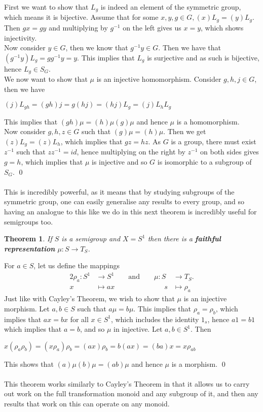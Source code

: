 \documentclass[12pt]{article}
\newtheorem{theorem}{Theorem}[subsection]
\begin{document}
	First we want to show that $L_g$ is indeed an element of the symmetric group, which means it is bijective. Assume that for some $x,y,g \in G, (x)L_g=(y)L_g$. Then $gx = gy$ and multiplying by $g^{-1}$ on the left gives us $x=y$, which shows injectivity.\\
	Now consider $y \in G$, then we know that $g^{-1}y \in G$. Then we have that $(g^{-1}y)L_g = gg^{-1}y = y$. This implies that $L_g$ is surjective and as such is bijective, hence $L_g \in S_G$. \\
	We now want to show that $\mu$ is an injective homomorphism. Consider $g,h,j \in G$, then we have
	\begin{center}
		$(j)L_{gh}=(gh)j=g(hj)=(hj)L_g=(j)L_hL_g$
	\end{center}
	This implies that $(gh)\mu = (h)\mu(g)\mu$ and hence $\mu$ is a homomorphism.\\
	Now consider $g,h,z \in G$ such that $(g)\mu = (h)\mu$. Then we get $(z)L_g = (z)L_h$, which implies that $gz=hz$. As $G$ is a group, there must exist $z^{-1}$ such that $zz^{-1} = id$, hence multiplying on the right by $z^{-1}$ on both sides gives $g=h$, which implies that $\mu$ is injective and so $G$ is isomorphic to a subgroup of $S_G$.
	\qed\\
\\This is incredibly powerful, as it means that by studying subgroups of the symmetric group, one can easily generalise any results to every group, and so having an analogue to this like we do in this next theorem is incredibly useful for semigroups too. 
\begin{theorem}
	If $S$ is a semigroup and $X=S^1$ then there is a \textbf{faithful representation} $\mu:S\to T_S$.
\end{theorem}
\proof
	For $a \in S$, let us define the mappings
		\begin{alignat*}{2}
			\rho_a:S^1 &\to S^1  \qquad	\text{and}\qquad 	\mu:S&\to T_S.\\		
			x&\mapsto ax  \qquad \qquad \qquad \quad s&\mapsto \rho_a
		\end{alignat*}
	Just like with Cayley's Theorem, we wish to show that $\mu$ is an injective morphism. Let $a,b \in S$ such that $a\mu=b\mu$. This implies that $\rho_a=\rho_b$, which implies that $ax=bx$ for all $x \in S^1$, which includes the identity $1_s$, hence $a1=b1$ which implies that $a=b$, and so $\mu$ in injective.
	Let $a,b \in S^1$. Then
	\begin{center}
		$x(\rho_a\rho_b)=(x\rho_a)\rho_b=(ax)\rho_b=b(ax)=(ba)x=x\rho_{ab}$
	\end{center}
	This shows that $(a)\mu(b)\mu=(ab)\mu$ and hence $\mu$ is a morphism.
	\qed\\
\\This theorem works similarly to Cayley’s Theorem in that it allows us to carry out work on the full transformation monoid and any subgroup of it, and then any results that work on this can operate on any monoid.
\end{document}
